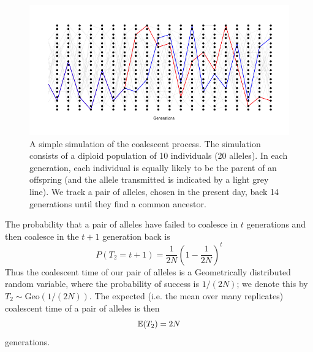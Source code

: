 \begin{figure}
\begin{center}
\includegraphics[width=\textwidth]{figures/Coalescent.png}
\end{center}
\caption{A simple simulation of the coalescent process. The simulation
  consists of a diploid population of 10 individuals (20 alleles). In
  each generation, each individual is equally likely to be the parent
  of an offspring (and the allele transmitted is indicated by a light
  grey line).  We track a
  pair of alleles, chosen in the present day, back 14 generations
  until they find a common ancestor.} \label{fig:Coalescent_simulation}
\end{figure}

The probability that a pair of alleles
have failed to coalesce in $t$ generations and then coalesce in the
$t+1$ generation back is 
\begin{equation}
 P(T_2=t+1) = \frac{1}{2N} \left(1- \frac{1}{2N} \right)^{t} \label{eqn:coal_time_dist}
\end{equation}
Thus the coalescent time of our pair of alleles is a Geometrically distributed random variable, where the probability of success is $1/(2N)$; we denote this by $T_2 \sim  \text{Geo}(1/(2N))$.
The expected (i.e. the mean over many replicates) coalescent time of a pair of alleles is then  
\begin{equation}
\mathbb{E}(T_2) = 2N 
\end{equation}
generations.\\


